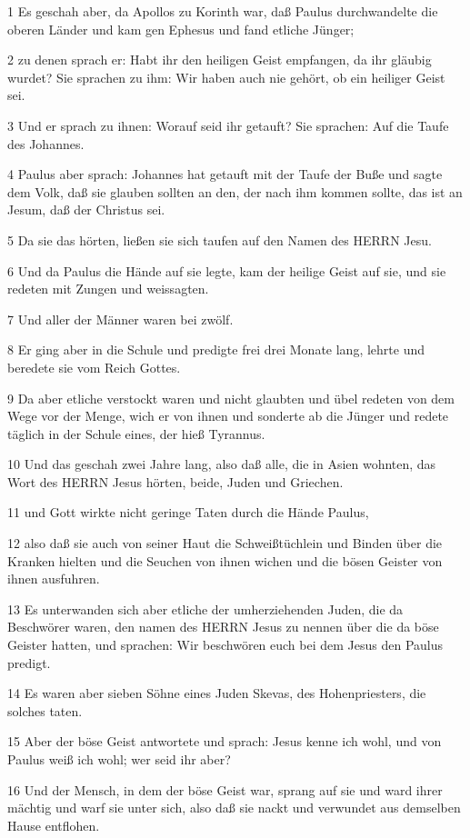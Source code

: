 \par 1 Es geschah aber, da Apollos zu Korinth war, daß Paulus durchwandelte die oberen Länder und kam gen Ephesus und fand etliche Jünger;
\par 2 zu denen sprach er: Habt ihr den heiligen Geist empfangen, da ihr gläubig wurdet? Sie sprachen zu ihm: Wir haben auch nie gehört, ob ein heiliger Geist sei.
\par 3 Und er sprach zu ihnen: Worauf seid ihr getauft? Sie sprachen: Auf die Taufe des Johannes.
\par 4 Paulus aber sprach: Johannes hat getauft mit der Taufe der Buße und sagte dem Volk, daß sie glauben sollten an den, der nach ihm kommen sollte, das ist an Jesum, daß der Christus sei.
\par 5 Da sie das hörten, ließen sie sich taufen auf den Namen des HERRN Jesu.
\par 6 Und da Paulus die Hände auf sie legte, kam der heilige Geist auf sie, und sie redeten mit Zungen und weissagten.
\par 7 Und aller der Männer waren bei zwölf.
\par 8 Er ging aber in die Schule und predigte frei drei Monate lang, lehrte und beredete sie vom Reich Gottes.
\par 9 Da aber etliche verstockt waren und nicht glaubten und übel redeten von dem Wege vor der Menge, wich er von ihnen und sonderte ab die Jünger und redete täglich in der Schule eines, der hieß Tyrannus.
\par 10 Und das geschah zwei Jahre lang, also daß alle, die in Asien wohnten, das Wort des HERRN Jesus hörten, beide, Juden und Griechen.
\par 11 und Gott wirkte nicht geringe Taten durch die Hände Paulus,
\par 12 also daß sie auch von seiner Haut die Schweißtüchlein und Binden über die Kranken hielten und die Seuchen von ihnen wichen und die bösen Geister von ihnen ausfuhren.
\par 13 Es unterwanden sich aber etliche der umherziehenden Juden, die da Beschwörer waren, den namen des HERRN Jesus zu nennen über die da böse Geister hatten, und sprachen: Wir beschwören euch bei dem Jesus den Paulus predigt.
\par 14 Es waren aber sieben Söhne eines Juden Skevas, des Hohenpriesters, die solches taten.
\par 15 Aber der böse Geist antwortete und sprach: Jesus kenne ich wohl, und von Paulus weiß ich wohl; wer seid ihr aber?
\par 16 Und der Mensch, in dem der böse Geist war, sprang auf sie und ward ihrer mächtig und warf sie unter sich, also daß sie nackt und verwundet aus demselben Hause entflohen.

